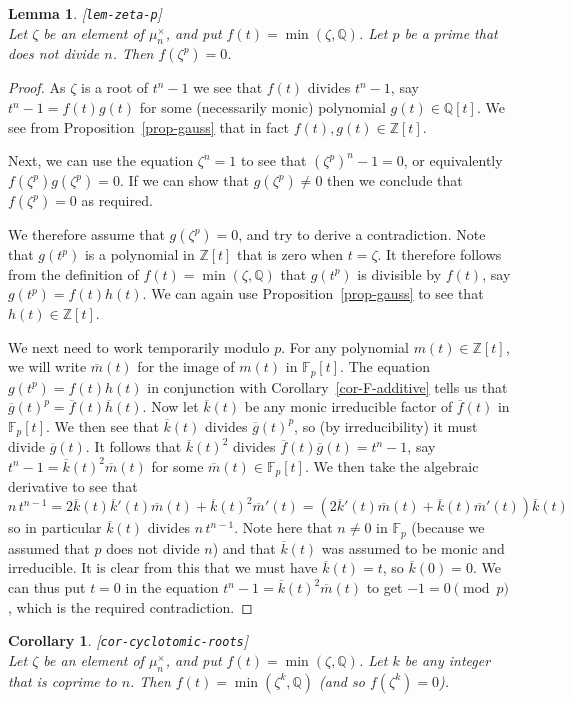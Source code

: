 \documentclass{amsart}
\newcommand{\lbl}[1]{\label{#1}\textup{[\texttt{#1}]}\ \\}
\newcommand{\lbl}{\label}
\newcommand{\Z}         {{\mathbb{Z}}}
\newcommand{\Q}         {{\mathbb{Q}}}
\newcommand{\F}         {{\mathbb{F}}}
\newcommand{\zt}        {\zeta}
\newcommand{\ov}[1]     {\overline{#1}}
\newcommand{\tm}        {\times}
\renewcommand{\:}{\colon}
\newtheorem{lemma}[theorem]{Lemma}
\newtheorem{corollary}[theorem]{Corollary}
\theoremstyle{definition}
\begin{document}
\begin{lemma}\lbl{lem-zeta-p}
 Let $\zt$ be an element of $\mu_n^\tm$, and put $f(t)=\min(\zt,\Q)$.
 Let $p$ be a prime that does not divide $n$.  Then $f(\zt^p)=0$.
\end{lemma}
\begin{proof}
 As $\zt$ is a root of $t^n-1$ we see that $f(t)$ divides $t^n-1$, say
 $t^n-1=f(t)g(t)$ for some (necessarily monic) polynomial
 $g(t)\in\Q[t]$.  We see from Proposition~\ref{prop-gauss} that in
 fact $f(t),g(t)\in\Z[t]$.  

 Next, we can use the equation $\zt^n=1$ to see that
 $(\zt^p)^n-1=0$, or equivalently $f(\zt^p)g(\zt^p)=0$.  If we can
 show that $g(\zt^p)\neq 0$ then we conclude that $f(\zt^p)=0$ as
 required.  

 We therefore assume that $g(\zt^p)=0$, and try to derive a
 contradiction.  Note that $g(t^p)$ is a polynomial in $\Z[t]$ that is
 zero when $t=\zt$.  It therefore follows from the definition of
 $f(t)=\min(\zt,\Q)$ that $g(t^p)$ is divisible by $f(t)$, say
 $g(t^p)=f(t)h(t)$.  We can again use Proposition~\ref{prop-gauss} to
 see that $h(t)\in\Z[t]$.

 We next need to work temporarily modulo $p$.  For any polynomial
 $m(t)\in\Z[t]$, we will write $\ov{m}(t)$ for the image of $m(t)$ in
 $\F_p[t]$.  The equation $g(t^p)=f(t)h(t)$ in conjunction with
 Corollary~\ref{cor-F-additive} tells us that
 $\ov{g}(t)^p=\ov{f}(t)\ov{h}(t)$.  Now let $\ov{k}(t)$ be any
 monic irreducible factor of $\ov{f}(t)$ in $\F_p[t]$.  We then see that
 $\ov{k}(t)$ divides $\ov{g}(t)^p$, so (by irreducibility) it must
 divide $\ov{g}(t)$.  It follows that $\ov{k}(t)^2$ divides
 $\ov{f}(t)\ov{g}(t)=t^n-1$, say $t^n-1=\ov{k}(t)^2\ov{m}(t)$ for some
 $\ov{m}(t)\in\F_p[t]$.  We then take the algebraic derivative to see that
 \[ n\,t^{n-1} = 
     2\ov{k}(t)\ov{k}'(t)\ov{m}(t) + \ov{k}(t)^2\ov{m}'(t) =
     (2\ov{k}'(t)\ov{m}(t) + \ov{k}(t)\ov{m}'(t))\ov{k}(t)
 \]  
 so in particular $\ov{k}(t)$ divides $n\,t^{n-1}$.  Note here that
 $n\neq 0$ in $\F_p$ (because we assumed that $p$ does not divide $n$)
 and that $\ov{k}(t)$ was assumed to be monic and irreducible.  It is
 clear from this that we must have $\ov{k}(t)=t$, so $\ov{k}(0)=0$.
 We can thus put $t=0$ in the equation $t^n-1=\ov{k}(t)^2\ov{m}(t)$ to
 get $-1=0\pmod{p}$, which is the required contradiction.
\end{proof}
\begin{corollary}\lbl{cor-cyclotomic-roots}
 Let $\zt$ be an element of $\mu_n^\tm$, and put $f(t)=\min(\zt,\Q)$.
 Let $k$ be any integer that is coprime to $n$.  Then
 $f(t)=\min(\zt^k,\Q)$ (and so $f(\zt^k)=0$). 
\end{corollary}
\end{document}
